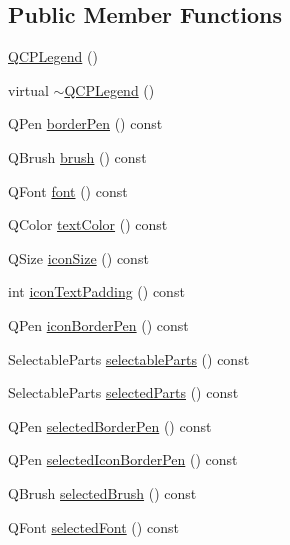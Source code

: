 \subsection*{Public Member Functions}
\begin{DoxyCompactItemize}
\item 
\mbox{\hyperlink{class_q_c_p_legend_a0001a456989bd07ea378883651fabd72}{Q\+C\+P\+Legend}} ()
\item 
virtual \mbox{\hyperlink{class_q_c_p_legend_a52b305572e20f4e7cb37e945e2b9bec0}{$\sim$\+Q\+C\+P\+Legend}} ()
\item 
Q\+Pen \mbox{\hyperlink{class_q_c_p_legend_a844b709a5632313416655f931c8e5631}{border\+Pen}} () const
\item 
Q\+Brush \mbox{\hyperlink{class_q_c_p_legend_aaddafd5cbe9175512311350bb3b563e6}{brush}} () const
\item 
Q\+Font \mbox{\hyperlink{class_q_c_p_legend_ae240104de3c3a4cfc0834dbaffa07ac9}{font}} () const
\item 
Q\+Color \mbox{\hyperlink{class_q_c_p_legend_aa96d8f1a183ec2be8c0461c0abebd6db}{text\+Color}} () const
\item 
Q\+Size \mbox{\hyperlink{class_q_c_p_legend_ae4f17a186558c82d2ba269f6e7164dda}{icon\+Size}} () const
\item 
int \mbox{\hyperlink{class_q_c_p_legend_a19668bb7f8fafe20d367cebf96269eaf}{icon\+Text\+Padding}} () const
\item 
Q\+Pen \mbox{\hyperlink{class_q_c_p_legend_a5b91d2ea68a4dd20238f660b80cd9945}{icon\+Border\+Pen}} () const
\item 
Selectable\+Parts \mbox{\hyperlink{class_q_c_p_legend_ad091ff5e11edbe0adecba81c35522ac7}{selectable\+Parts}} () const
\item 
Selectable\+Parts \mbox{\hyperlink{class_q_c_p_legend_a3efbf879f6936ec337690985e567dc6f}{selected\+Parts}} () const
\item 
Q\+Pen \mbox{\hyperlink{class_q_c_p_legend_add8204bf083c82cc5def29093501a017}{selected\+Border\+Pen}} () const
\item 
Q\+Pen \mbox{\hyperlink{class_q_c_p_legend_ad8eb320ca3a25928982a65163e8f883b}{selected\+Icon\+Border\+Pen}} () const
\item 
Q\+Brush \mbox{\hyperlink{class_q_c_p_legend_a77dfa9340f68ca195f1817a93db09757}{selected\+Brush}} () const
\item 
Q\+Font \mbox{\hyperlink{class_q_c_p_legend_a483ffd35d64710a165da87b9d9f11110}{selected\+Font}} () const
\item 

\end{DoxyCompactItemize}
